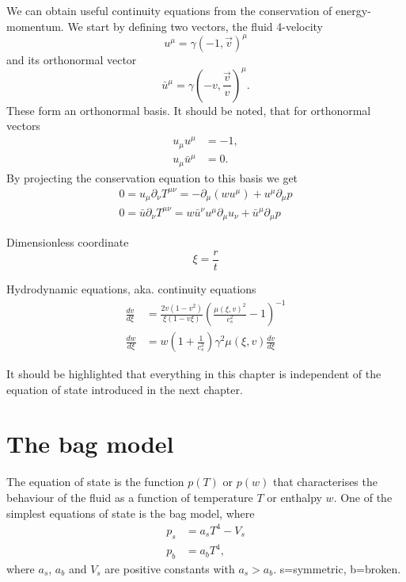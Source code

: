 We can obtain useful continuity equations from the conservation of energy-momentum.
We start by defining two vectors, the fluid 4-velocity
\begin{equation}
u^\mu = \gamma(-1, \overrightarrow{v})^\mu
\end{equation}
and its orthonormal vector
\begin{equation}
\bar{u}^\mu = \gamma(-v, \frac{\overrightarrow{v}}{v})^\mu.
\end{equation}
These form an orthonormal basis.
It should be noted, that for orthonormal vectors
\begin{align}
u_\mu u^\mu &= -1, \\
u_\mu \bar{u}^\mu &= 0.
\end{align}
By projecting the conservation equation to this basis we get
\cite[eq. 7.28-7.29]{lecture_notes}
\begin{align}
0 = u_\mu \partial_\nu T^{\mu \nu} = -\partial_\mu (w u^\mu) + u^\mu \partial_\mu p \\
0 = \bar{u} \partial_\nu T^{\mu \nu} = w \bar{u}^\nu u^\mu \partial_\mu u_\nu + \bar{u}^\mu \partial_\mu p
\end{align}

Dimensionless coordinate
\begin{equation}
\xi = \frac{r}{t}
\end{equation}

Hydrodynamic equations, aka. continuity equations
\cites[eq. 7.30-7.31]{lecture_notes}[eq. 5]{giese_2021}
\begin{align}
\frac{dv}{d\xi} &= \frac{2v(1-v^2)}{\xi(1-v\xi)} \left( \frac{\mu(\xi,v)^2}{c_s^2} - 1 \right)^{-1} \\
\frac{dw}{d\xi} &= w \left( 1 + \frac{1}{c_s^2} \right) \gamma^2 \mu(\xi,v) \frac{dv}{d\xi}
\end{align}

It should be highlighted that everything in this chapter is independent of the equation of state introduced in the next chapter.


\section{The bag model}
The equation of state is the function $p(T)$ or $p(w)$ that characterises the behaviour of the fluid as a function of temperature $T$ or enthalpy $w$.
One of the simplest equations of state is the bag model, where
\cites[eq. 7.33]{lecture_notes}[eq. 8-9]{giese_2020}
\begin{align}
p_s &= a_s T^4 - V_s
\label{eq:bag_ps} \\
p_b &= a_b T^4,
\label{eq:bag_pb}
\end{align}
where $a_s$, $a_b$ and $V_s$ are positive constants with $a_s > a_b$.
s=symmetric, b=broken.

